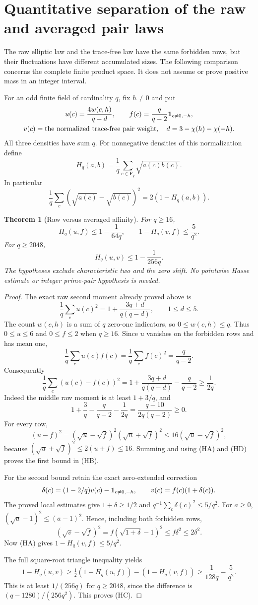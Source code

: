 \documentclass[11pt]{article}
\newtheorem{theorem}{Theorem}[section]
\newcommand{\F}{\mathbf F}
\begin{document}
\section{Quantitative separation of the raw and averaged pair laws}
The raw elliptic law and the trace-free law have the same forbidden
rows, but their fluctuations have different accumulated sizes. The
following comparison concerns the complete finite product space. It
does not assume or prove positive mass in an integer interval.

For an odd finite field of cardinality \(q\), fix \(h\ne0\) and put
\[
\begin{gathered}
 u(c)=\frac{4w(c,h)}{q-d},\qquad
 f(c)=\frac{q}{q-2}{\bf1}_{c\ne0,-h},\\
 v(c)=\hbox{the normalized trace-free pair weight},
 \quad d=3-\chi(h)-\chi(-h).
\end{gathered}
\]
All three densities have sum \(q\). For nonnegative densities of this
normalization define
\[
 H_q(a,b)=\frac1q\sum_{c\in\F_q}\sqrt{a(c)b(c)}.
\]
In particular
\[
 \frac1q\sum_c(\sqrt{a(c)}-\sqrt{b(c)})^2=2(1-H_q(a,b)).
 \tag{HA}
\]

\begin{theorem}[Raw versus averaged affinity]
For \(q\ge16\),
\[
 H_q(u,f)\le1-\frac1{64q},\qquad
 1-H_q(v,f)\le\frac5{q^2}.
 \tag{HB}
\]
For \(q\ge2048\),
\[
 H_q(u,v)\le1-\frac1{256q}.
 \tag{HC}
\]
The hypotheses exclude characteristic two and the zero shift.
No pointwise Hasse estimate or integer prime-pair hypothesis is needed.
\end{theorem}
\begin{proof}
The exact raw second moment already proved above is
\[
 \frac1q\sum_c u(c)^2
   =1+\frac{3q+d}{q(q-d)},\qquad 1\le d\le5.
\]
The count \(w(c,h)\) is a sum of \(q\) zero-one indicators, so
\(0\le w(c,h)\le q\). Thus \(0\le u\le6\) and \(0\le f\le2\)
when \(q\ge16\). Since \(u\) vanishes on the forbidden rows and
has mean one,
\[
 \frac1q\sum_c u(c)f(c)=\frac1q\sum_c f(c)^2=\frac q{q-2}.
\]
Consequently
\[
 \frac1q\sum_c(u(c)-f(c))^2
 =1+\frac{3q+d}{q(q-d)}-\frac q{q-2}\ge\frac1{2q}.
 \tag{HD}
\]
Indeed the middle raw moment is at least \(1+3/q\), and
\[
 1+\frac3q-\frac q{q-2}-\frac1{2q}
   =\frac{q-10}{2q(q-2)}\ge0.
\]
For every row,
\[
 (u-f)^2=(\sqrt u-\sqrt f)^2(\sqrt u+\sqrt f)^2
 \le16(\sqrt u-\sqrt f)^2,
\]
because \((\sqrt u+\sqrt f)^2\le2(u+f)\le16\).
Summing and using (HA) and (HD) proves the first bound in (HB).

For the second bound retain the exact zero-extended correction
\[
 \delta(c)=(1-2/q)v(c)-{\bf1}_{c\ne0,-h},\qquad
 v(c)=f(c)(1+\delta(c)).
\]
The proved local estimates give \(1+\delta\ge1/2\) and
\(q^{-1}\sum_c\delta(c)^2\le5/q^2\). For \(a\ge0\),
\((\sqrt a-1)^2\le(a-1)^2\). Hence, including both forbidden rows,
\[
 (\sqrt v-\sqrt f)^2
   =f(\sqrt{1+\delta}-1)^2\le f\delta^2\le2\delta^2.
\]
Now (HA) gives \(1-H_q(v,f)\le5/q^2\).

The full square-root triangle inequality yields
\[
 1-H_q(u,v)\ge
   \tfrac12(1-H_q(u,f))-(1-H_q(v,f))
   \ge\frac1{128q}-\frac5{q^2}.
\]
This is at least \(1/(256q)\) for \(q\ge2048\), since the difference
is \((q-1280)/(256q^2)\). This proves (HC).
\end{proof}
\end{document}
